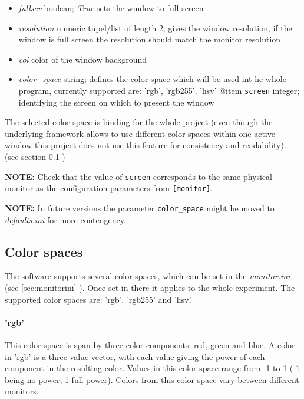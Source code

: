 \documentclass[12pt,a4paper]{book}
\begin{document}
\begin{itemize}
\item \emph{fullscr} boolean; \emph{True} sets the window to full screen
\item \emph{resolution} numeric tupel/list of length 2; gives the window resolution, if the window is full screen the resolution should match the monitor resolution 
\item \emph{col} color of the window background
\item \emph{color\_space} string; defines the color space which will be used int he whole program, currently supported are: 'rgb', 'rgb255', 'hsv'
@item \verb|screen| integer; identifying the screen on which to present the window
\end{itemize}

The selected color space is binding for the whole project (even though the underlying framework allows to use different color spaces within one active window this project does not use this feature for consistency and readability). (see section \ref{sec:color_spaces} )

\textbf{NOTE:} Check that the value of \verb|screen| corresponds to the same physical monitor as the configuration parameters from \verb|[monitor]|.

\textbf{NOTE:} In future versions the parameter \verb|color_space| might be moved to \textit{defaults.ini} for more contengency.

\subsection{Color spaces}\label{sec:color_spaces}

The software supports several color spaces, which can be set in the \textit{monitor.ini} (see \ref{sec:monitorini} ). Once set in there it applies to the whole experiment. The supported color spaces are: 'rgb', 'rgb255' and 'hsv'.

\paragraph{'rgb'} This color space is span by three color-components: red, green and blue. A color in 'rgb' is a three value vector, with each value giving the power of each component in the resulting color. Values in this color space range from -1 to 1 (-1 being no power, 1 full power). Colors from this color space vary between different monitors.
\end{document}
